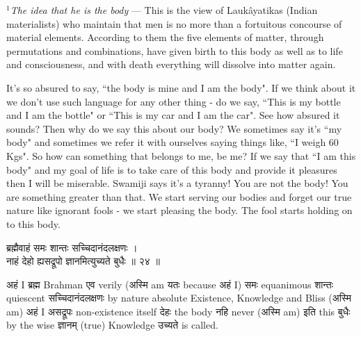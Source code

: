 \documentclass{article}
\begin{document}
{\small \textit{$^1$The idea that he is the body} --- This is the view of
Laukâyatikas (Indian materialists) who maintain that men is no more than a
fortuitous concourse of material elements. According to them the five elements
of matter, through permutations and combinations, have given birth to this body
as well as to life and consciousness, and with death everything will dissolve
into matter again.

\begin{oframed}

    It's so absured to say, ``the body is mine and I am the body".  If we think
    about it we don't use such language for any other thing - do we say, ``This
    is my bottle and I am the bottle" or ``This is my car and I am the car".
    See how absured it sounds? Then why do we say this about our body? We
    sometimes say it's ``my body" and sometimes we refer it with ourselves
    saying things like, ``I weigh 60 Kgs". So how can something that belongs to
    me, be me? If we say that ``I am this body" and my goal of life is to take
    care of this body and provide it pleasures then I will be miserable.
    Swamiji says it's a tyranny! You are not the body! You are something
    greater than that. We start serving our bodies and forget our true nature
    like ignorant fools - we start pleasing the body. The fool starts holding
    on to this body.

\end{oframed}

\begin{large}
\begin{center}
    \begin{hindi}
    ब्रह्मैवाहं समः शान्तः सच्चिदानंदलक्षणः ।\\
    नाहं देहो ह्यसद्रूपो ज्ञानमित्युच्यते बुधैः ॥ २४ ॥
    \end{hindi}
\end{center}
\end{large}

\texthindi{अहं}
I
\texthindi{ब्रह्म}
Brahman
\texthindi{एव}
verily
(\texthindi{अस्मि}
am
\texthindi{यतः}
because
\texthindi{अहं}
I)
\texthindi{समः}
equanimous
\texthindi{शान्तः}
quiescent
\texthindi{सच्चिदानंदलक्षणः}
by nature absolute Existence, Knowledge and Bliss
(\texthindi{अस्मि}
am)
\texthindi{अहं}
I
\texthindi{असद्रूपः}
non-existence itself
\texthindi{देहः}
the body
\texthindi{नहि}
never
(\texthindi{अस्मि}
am)
\texthindi{इति}
this
\texthindi{बुधैः}
by the wise
\texthindi{ज्ञानम्}
(true) Knowledge
\texthindi{उच्यते}
is called.

}
\end{document}
